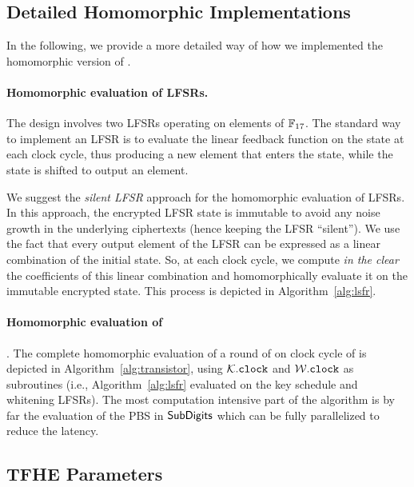 	
\subsection{Detailed Homomorphic Implementations}
\label{sec:detailed_implementation}

In the following, we provide a more detailed way of how we implemented the homomorphic version of \coolName.

\paragraph{Homomorphic evaluation of LFSRs.}
The \coolName design involves two LFSRs operating on elements of $\mathbb{F}_{17}$. The standard way to implement an LFSR is to evaluate the linear feedback function on the state at each clock cycle, thus producing a new element that enters the state, while the state is shifted to output an element. 

We suggest the \emph{silent LFSR} approach for the homomorphic evaluation of LFSRs. In this approach, the encrypted LFSR state is immutable to avoid any noise growth in the underlying ciphertexts (hence keeping the LFSR ``silent''). We use the fact that every output element of the LFSR can be expressed as a linear combination of the initial state. So, at each clock cycle, we compute \emph{in the clear} the coefficients of this linear combination and homomorphically evaluate it on the immutable encrypted state. This process is depicted in Algorithm~\ref{alg:lsfr}.





\paragraph{Homomorphic evaluation of} \coolName. The complete homomorphic evaluation of a round of on clock cycle of \coolName is depicted in Algorithm~\ref{alg:transistor}, using $\mathcal{K}.\texttt{clock}$ and $\mathcal{W}.\texttt{clock}$ as subroutines (i.e., Algorithm~\ref{alg:lsfr} evaluated on the key schedule and whitening LFSRs). The most computation intensive part of the algorithm is by far the evaluation of the \gls{PBS} in $\text{\textsf{SubDigits}}$ which can be fully parallelized to reduce the latency.


 




\subsection{\gls{TFHE} Parameters} 
\label{sec:tfhe-parameters}


